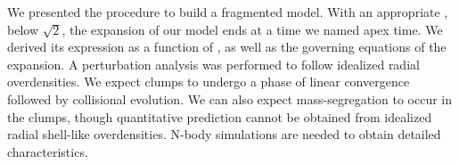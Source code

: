 We presented the procedure to build a \HubLem fragmented model. With an appropriate \tHub, below $\sqrt{2}$, the expansion of our model ends at a time we named apex time. We derived its expression as a function of \tHub, as well as the governing equations of the expansion. A perturbation analysis was performed to follow idealized radial overdensities. We expect clumps to undergo a phase of linear convergence followed by collisional evolution. We can also expect mass-segregation to occur in the clumps, though quantitative prediction cannot be obtained from idealized radial shell-like overdensities. N-body simulations are needed to obtain detailed characteristics.
















